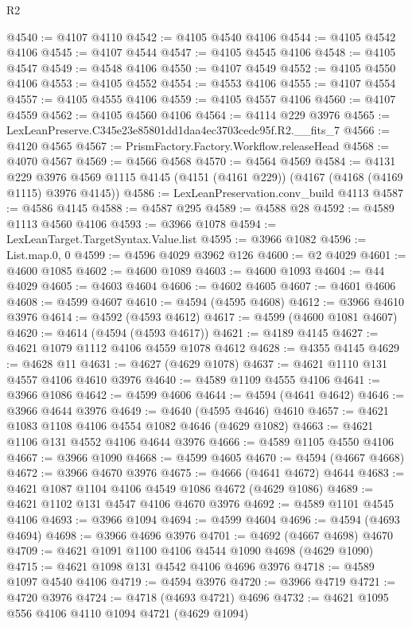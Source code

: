 \begin{lexlean}{R2}
\begin{coremodule}
@4540 := @4107 @4110
@4542 := @4105 @4540 @4106
@4544 := @4105 @4542 @4106
@4545 := @4107 @4544
@4547 := @4105 @4545 @4106
@4548 := @4105 @4547
@4549 := @4548 @4106
@4550 := @4107 @4549
@4552 := @4105 @4550 @4106
@4553 := @4105 @4552
@4554 := @4553 @4106
@4555 := @4107 @4554
@4557 := @4105 @4555 @4106
@4559 := @4105 @4557 @4106
@4560 := @4107 @4559
@4562 := @4105 @4560 @4106
@4564 := @4114 @229 @3976
@4565 := LexLeanPreserve.C345e23e85801dd1daa4ec3703cedc95f.R2.__fits_7
@4566 := @4120 @4565
@4567 := PrismFactory.Factory.Workflow.releaseHead
@4568 := @4070 @4567
@4569 := @4566 @4568
@4570 := @4564 @4569
@4584 := @4131
    @229
    @3976
    @4569
    @1115
    @4145
    (@4151 (@4161 @229))
    (@4167 (@4168 (@4169 @1115) @3976 @4145))
@4586 := LexLeanPreservation.conv_build @4113
@4587 := @4586 @4145
@4588 := @4587 @295
@4589 := @4588 @28
@4592 := @4589 @1113 @4560 @4106
@4593 := @3966 @1078
@4594 := LexLeanTarget.TargetSyntax.Value.list
@4595 := @3966 @1082
@4596 := List.map.{0, 0}
@4599 := @4596 @4029 @3962 @126
@4600 := @2 @4029
@4601 := @4600 @1085
@4602 := @4600 @1089
@4603 := @4600 @1093
@4604 := @44 @4029
@4605 := @4603 @4604
@4606 := @4602 @4605
@4607 := @4601 @4606
@4608 := @4599 @4607
@4610 := @4594 (@4595 @4608)
@4612 := @3966 @4610 @3976
@4614 := @4592 (@4593 @4612)
@4617 := @4599 (@4600 @1081 @4607)
@4620 := @4614 (@4594 (@4593 @4617))
@4621 := @4189 @4145
@4627 := @4621 @1079 @1112 @4106 @4559 @1078 @4612
@4628 := @4355 @4145
@4629 := @4628 @11
@4631 := @4627 (@4629 @1078)
@4637 := @4621 @1110 @131 @4557 @4106 @4610 @3976
@4640 := @4589 @1109 @4555 @4106
@4641 := @3966 @1086
@4642 := @4599 @4606
@4644 := @4594 (@4641 @4642)
@4646 := @3966 @4644 @3976
@4649 := @4640 (@4595 @4646) @4610
@4657 := @4621 @1083 @1108 @4106 @4554 @1082 @4646 (@4629 @1082)
@4663 := @4621 @1106 @131 @4552 @4106 @4644 @3976
@4666 := @4589 @1105 @4550 @4106
@4667 := @3966 @1090
@4668 := @4599 @4605
@4670 := @4594 (@4667 @4668)
@4672 := @3966 @4670 @3976
@4675 := @4666 (@4641 @4672) @4644
@4683 := @4621 @1087 @1104 @4106 @4549 @1086 @4672 (@4629 @1086)
@4689 := @4621 @1102 @131 @4547 @4106 @4670 @3976
@4692 := @4589 @1101 @4545 @4106
@4693 := @3966 @1094
@4694 := @4599 @4604
@4696 := @4594 (@4693 @4694)
@4698 := @3966 @4696 @3976
@4701 := @4692 (@4667 @4698) @4670
@4709 := @4621 @1091 @1100 @4106 @4544 @1090 @4698 (@4629 @1090)
@4715 := @4621 @1098 @131 @4542 @4106 @4696 @3976
@4718 := @4589 @1097 @4540 @4106
@4719 := @4594 @3976
@4720 := @3966 @4719
@4721 := @4720 @3976
@4724 := @4718 (@4693 @4721) @4696
@4732 := @4621 @1095 @556 @4106 @4110 @1094 @4721 (@4629 @1094)

\end{coremodule}
\end{lexlean}
